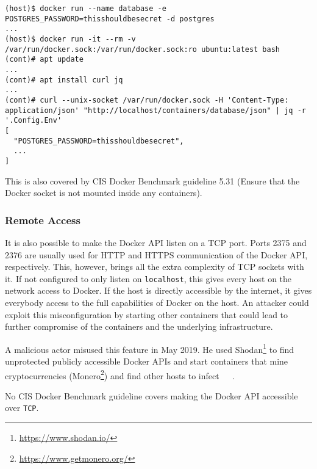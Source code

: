 \begin{lstlisting}[caption={Example extract secrets using the Docker API.},captionpos=b]
(host)$ docker run --name database -e POSTGRES_PASSWORD=thisshouldbesecret -d postgres
...
(host)$ docker run -it --rm -v /var/run/docker.sock:/var/run/docker.sock:ro ubuntu:latest bash
(cont)# apt update
...
(cont)# apt install curl jq
...
(cont)# curl --unix-socket /var/run/docker.sock -H 'Content-Type: application/json' "http://localhost/containers/database/json" | jq -r '.Config.Env'
[
  "POSTGRES_PASSWORD=thisshouldbesecret",
  ...
]
\end{lstlisting}

\medskip

This is also covered by CIS Docker Benchmark guideline 5.31 (Ensure that the Docker socket is not mounted inside any containers).

\subsubsection{Remote Access}\label{subsubsection:remote-access}
It is also possible to make the Docker API listen on a TCP port. Ports 2375 and 2376 are usually used for HTTP and HTTPS communication of the Docker API, respectively. This, however, brings all the extra complexity of TCP sockets with it. If not configured to only listen on \lstinline{localhost}, this gives every host on the network access to Docker. If the host is directly accessible by the internet, it gives everybody access to the full capabilities of Docker on the host. An attacker could exploit this misconfiguration by starting other containers that could lead to further compromise of the containers and the underlying infrastructure\cite{Metasploit-Unprotected-TCP-Socket}.

\medskip

A malicious actor misused this feature in May 2019. He used Shodan\footnote{\url{https://www.shodan.io/}} to find unprotected publicly accessible Docker APIs and start containers that mine cryptocurrencies (Monero\footnote{\url{https://www.getmonero.org/}}) and find other hosts to infect~\cite{zoolu2-bot-1807}~\cite{zoolu2-bot-1809}~\cite{zoolu2-bot-1853}.

\medskip

No CIS Docker Benchmark guideline covers making the Docker API accessible over \lstinline{TCP}.
